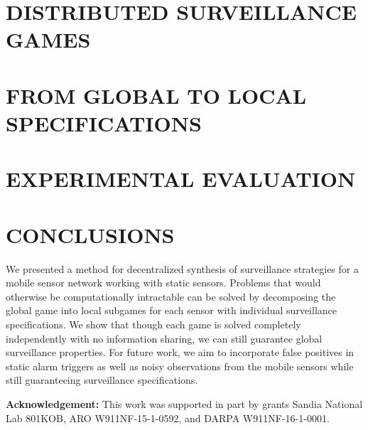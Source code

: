\documentclass[letterpaper, 10 pt, conference]{ieeeconf}  %
\begin{document}



\section{DISTRIBUTED SURVEILLANCE GAMES}


\section{FROM GLOBAL TO LOCAL SPECIFICATIONS}

%
%

\section{EXPERIMENTAL EVALUATION}\label{sec:experiments}



\section{CONCLUSIONS}
We presented a method for decentralized synthesis of surveillance strategies for a mobile sensor network working with static sensors. Problems that would otherwise be computationally intractable can be solved by decomposing the global game into local subgames for each sensor with individual surveillance specifications. We show that though each game is solved completely independently with no information sharing, we can still guarantee global surveillance properties.
For future work, we aim to incorporate false positives in static alarm triggers as well as noisy observations from the mobile sensors while still guaranteeing surveillance specifications.

{\bf Acknowledgement:} This work was supported in part by grants Sandia National Lab 801KOB, ARO W911NF-15-1-0592,  and DARPA W911NF-16-1-0001.









\end{document}
